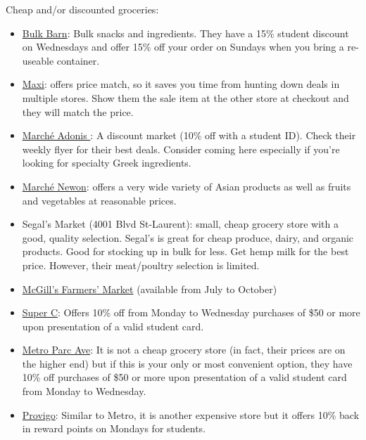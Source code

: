 Cheap and/or discounted groceries: 
\begin{itemize}
    \item \href{https://www.bulkbarn.ca/home-en/index_deals.html}{Bulk Barn}: Bulk snacks and ingredients. They have a 15\% student discount on Wednesdays
and offer 15\% off your order on Sundays when you bring a re-useable container.
\item \href{https://www.maxi.ca/fr}{Maxi}: offers price match, so it saves you time from
hunting down deals in multiple stores. Show them the sale item at the other store at checkout and
they will match the price.
\item \href{https://groupeadonis.ca/en}{Marché Adonis }: A discount market (10\% off with a student ID). Check their weekly flyer for their best deals. Consider coming here especially if
you're looking for specialty Greek ingredients.
\item \href{https://www.marchenewon.com/en}{Marché Newon}: offers a very wide variety of Asian products as well as fruits and vegetables at reasonable prices.
\item Segal's Market (4001 Blvd St-Laurent): small, cheap grocery store with a good, quality
selection. Segal's is great for cheap produce, dairy, and organic products. Good for stocking up in bulk for less. Get hemp milk for the best price. However, their meat/poultry selection is limited.
\item \href{https://www.facebook.com/mcgillfarmersmarket/}{McGill's Farmers’ Market} (available from July to October)   
\item \href{https://www.superc.ca/en/student-discount}{Super C}: Offers 10\% off from Monday to Wednesday purchases of \$50 or more upon presentation of a valid student card.
    \item \href{https://www.metro.ca/en/products-to-discover/grocery/whats-new/metro-avenue-parc}{Metro Parc Ave}: It is not a cheap grocery store (in fact, their prices are on the higher end) but if this is your only or most convenient option, they have 10\% off purchases of \$50 or more upon presentation of a valid student card from Monday to Wednesday.
    \item \href{https://www.provigo.ca/en}{Provigo}: Similar to Metro, it is another expensive store but it offers 10\% back in reward points on Mondays for students.

\end{itemize}

